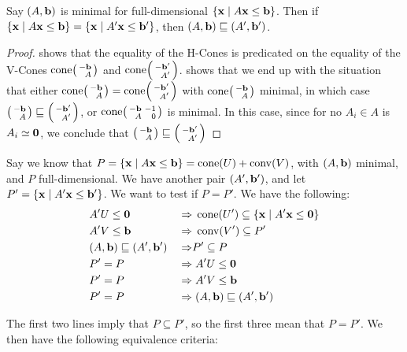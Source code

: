 \begin{Prop}
	Say $(A,\mathbf{b})$ is minimal for full-dimensional $\left\{\mathbf{x}\;|\; A\mathbf{x}\leq \mathbf{b}\right\}$.  Then if $\left\{\mathbf{x}\;|\; A\mathbf{x}\leq \mathbf{b}\right\} = \left\{\mathbf{x}\;|\; A'\mathbf{x}\leq \mathbf{b}'\right\}$, then $(A,\mathbf{b}) \sqsubseteq (A',\mathbf{b}')$.
\end{Prop}

\begin{proof}
   shows that the equality of the H-Cones is predicated on the equality of the V-Cones $\cone\psmb -\b \\ A \psme$ and $\cone\psmb -\b' \\ A' \psme$.   shows that we end up with the situation that either $\cone\psmb -\b \\ A \psme = \cone\psmb -\b' \\ A' \psme$ with $\cone\psmb -\b \\ A \psme$ minimal, in which case $\psmb -\b \\ A \psme \sqsubseteq \psmb -\b' \\ A' \psme$, or $\cone\psmb -\b & -1 \\ A & 0\psme$ is minimal.  In this case, since for no $A_i \in A$ is $A_i \simeq \mathbf{0}$, we conclude that $\psmb -\b \\ A \psme \sqsubseteq \psmb -\b' \\ A' \psme$
\end{proof}

Say we know that $P = \left\{\mathbf{x}\;|\; A\mathbf{x}\leq \mathbf{b}\right\} = \operatorname{cone}(U) + \operatorname{conv}(V)$, with $(A,\mathbf{b})$ minimal, and $P$ full-dimensional.  We have another pair $(A',\mathbf{b}')$, and let $P'=\left\{\mathbf{x}\;|\; A'\mathbf{x}\leq \mathbf{b}'\right\}$.  We want to test if $P = P'$.  We have the following:
\begin{alignat*}{2}
	 & A'U\leq\mathbf{0} \;                \; & \Rightarrow & \; \operatorname{cone}(U') \subseteq \left\{\mathbf{x}\;|\; A'\mathbf{x}\leq\mathbf{0}\right\} \\
	 & A'V\leq\mathbf{b} \;                   & \Rightarrow & \; \operatorname{conv}(V') \subseteq P'      \\
	 & (A,\mathbf{b}) \sqsubseteq (A',\mathbf{b}') \; & \Rightarrow & P' \subseteq P                 \\
	 & P' = P \;                      & \Rightarrow & \; A'U\leq\mathbf{0}                   \\
	 & P' = P \;                      & \Rightarrow & \; A'V\leq\mathbf{b}                   \\
	 & P' = P \;                      & \Rightarrow & \;(A,\mathbf{b}) \sqsubseteq (A',\mathbf{b}')
\end{alignat*}

The first two lines imply that $P \subseteq P'$, so the first three mean that $P = P'$.  We then have the following equivalence criteria:

